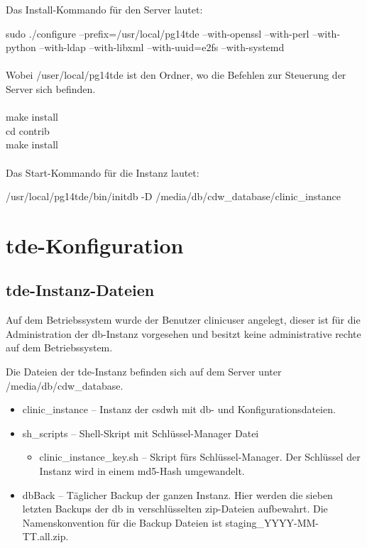     Das Install-Kommando für den Server lautet: 
           
    sudo ./configure --prefix=/usr/local/pg14tde --with-openssl --with-perl --with-python --with-ldap --with-libxml --with-uuid=e2fs --with-systemd\\ \\
    
    
    Wobei /user/local/pg14tde ist den Ordner, wo die Befehlen zur Steuerung der Server sich befinden. \\ \\
   make install \\
   cd contrib \\
   make install \\ \\

    Das Start-Kommando für die Instanz lautet: 
    
    /usr/local/pg14tde/bin/initdb -D /media/db/cdw\_database/clinic\_instance
    

	\section{\acs{tde}-Konfiguration} 
	
    \subsection{\acs{tde}-Instanz-Dateien}
    Auf dem Betriebssystem wurde der Benutzer \textsf{clinicuser} angelegt, dieser ist für die Administration der \ac{db}-Instanz vorgesehen und besitzt keine administrative rechte auf dem Betriebssystem.
    
    Die Dateien der \ac{tde}-Instanz befinden sich auf dem Server unter \textsf{/media/db/cdw\_database}.
    \begin{itemize}
    	\item \textsf{clinic\_instance} -- Instanz der \ac{csdwh} mit \ac{db}- und Konfigurationsdateien.
    	\item \textsf{sh\_scripts} -- Shell-Skript mit Schlüssel-Manager Datei
    	\begin{itemize}
           \item \textsf{clinic\_instance\_key.sh} -- Skript fürs Schlüssel-Manager. Der Schlüssel der Instanz wird in einem \ac{md5}-Hash umgewandelt.
    	\end{itemize}
    	\item \textsf{dbBack} -- Täglicher Backup der ganzen Instanz. Hier werden die sieben letzten Backups der \ac{db} in verschlüsselten \ac{zip}-Dateien aufbewahrt. Die Namenskonvention für die Backup Dateien ist \textsf{staging\_YYYY-MM-TT.all.zip}.
    \end{itemize}

